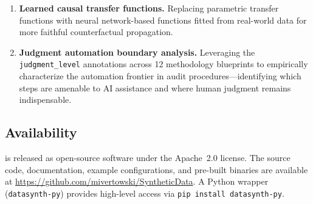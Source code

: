 \begin{enumerate}
  \item \textbf{Learned causal transfer functions.}  Replacing
    parametric transfer functions with neural network-based functions
    fitted from real-world data for more faithful counterfactual
    propagation.

  \item \textbf{Judgment automation boundary analysis.}  Leveraging
    the \texttt{judgment\_level} annotations across 12 methodology
    blueprints to empirically characterize the automation frontier in
    audit procedures---identifying which steps are amenable to AI
    assistance and where human judgment remains indispensable.
\end{enumerate}

\subsection{Availability}
\label{sec:availability}

\system{} is released as open-source software under the Apache~2.0
license.  The source code, documentation, example configurations,
and pre-built binaries are available at
\url{https://github.com/mivertowski/SyntheticData}.
A Python wrapper (\texttt{datasynth-py}) provides high-level access
via \texttt{pip install datasynth-py}.

